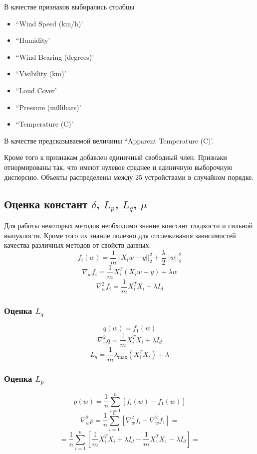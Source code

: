 \documentclass[a4paper,12pt]{extarticle}
\begin{document}
    В качестве признаков выбирались столбцы 
    \begin{itemize}
        \item ``Wind Speed (km/h)'
        \item ``Humidity'
        \item ``Wind Bearing (degrees)'
        \item ``Visibility (km)'
        \item ``Loud Cover'
        \item ``Pressure (millibars)'
        \item ``Temperature (C)'
    \end{itemize}
    В качестве предсказываемой величины ``Apparent Temperature (C)'.

    
    Кроме того к признакам добавлен единичный свободный член.
    Признаки отнормированы так, что имеют нулевое среднее и единичную выборочную дисперсию.
    Объекты распределены между 25 устройствами в случайном порядке. 

    
    \subsection{Оценка констант $\delta$, $L_p$, $L_q$, $\mu$}

    Для работы некоторых методов необходимо знание констант гладкости и сильной выпуклости.
    Кроме того их знание полезно для отслеживания зависимостей качества различных методов от свойств данных. 
     \[ f_i(w) = \frac{1}{m}||X_i w - y||_2^2 + \frac{\lambda}{2} ||w||_2^2\]
    \[ \nabla_{w} f_i = \frac{1}{m}X_i^T(X_i w - y) + \lambda w\]
    \[\nabla_{w}^2 f_i  = \frac{1}{m}X_i^T X_i + \lambda I_d\]

    \subsubsection{Оценка $L_q$}
   
    \[q(w) = f_1(w) \]
    \[\nabla_{w}^2 q =  \frac{1}{m}X_i^T X_i + \lambda I_d\]
    \[L_q =  \frac{1}{m} \lambda_{\max}(X_i^T X_i ) + \lambda\]

    \subsubsection{Оценка $L_p$}
    \[p(w) = \frac{1}{n} \sum_{i=1}^{n} \left[f_i(w) - f_1(w)\right]\]
    \[\nabla_{w}^2p = \frac{1}{n}\sum_{i = 1}^{n} [\nabla_{w}^2f_i - \nabla_{w}^2f_1] = \]
    \[ = \frac{1}{n}\sum_{i = 1}^{n} [\frac{1}{m}X_i^T X_i + \lambda I_d - \frac{1}{m}X_1^T X_1- \lambda I_d] = \] 
    
\end{document}

